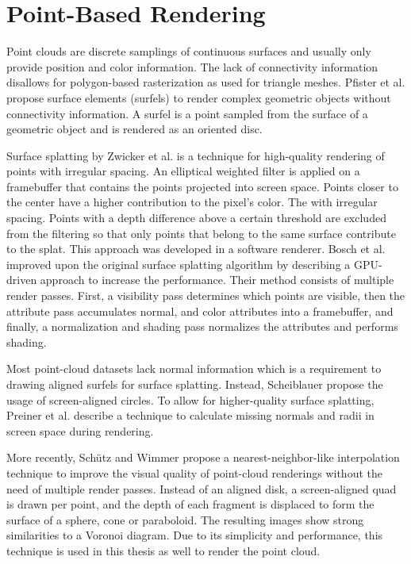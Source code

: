 \section{Point-Based Rendering}
\label{sec:related_work_point_rendering}
Point clouds are discrete samplings of continuous surfaces and usually only provide position and color information. The lack of connectivity information disallows for polygon-based rasterization as used for triangle meshes. Pfister et al. \cite{pfister2000surfels} propose surface elements (surfels) to render complex geometric objects without connectivity information. A surfel is a point sampled from the surface of a geometric object and is rendered as an oriented disc. 

\par

Surface splatting by Zwicker et al. \cite{zwicker2001surface} is a technique for high-quality rendering of points with irregular spacing. An elliptical weighted filter is applied on a framebuffer that contains the points projected into screen space. Points closer to the center have a higher contribution to the pixel's color. The with irregular spacing. Points with a depth difference above a certain threshold are excluded from the filtering so that only points that belong to the same surface contribute to the splat.  This approach was developed in a software renderer. Bosch et al. \cite{botsch2005high} improved upon the original surface splatting algorithm by describing a GPU-driven approach to increase the performance. Their method consists of multiple render passes. First, a visibility pass determines which points are visible, then the attribute pass accumulates normal, and color attributes into a framebuffer, and finally, a normalization and shading pass normalizes the attributes and performs shading. 

\par

Most point-cloud datasets lack normal information which is a requirement to drawing aligned surfels for surface splatting. Instead, Scheiblauer \cite{scheiblauer2011consolidated} propose the usage of screen-aligned circles. To allow for higher-quality surface splatting, Preiner et al. \cite{preiner2012auto} describe a technique to calculate missing normals and radii in screen space during rendering. 

\par

More recently, Schütz and Wimmer \cite{schutz2015high} propose a nearest-neighbor-like interpolation technique to improve the visual quality of point-cloud renderings without the need of multiple render passes. Instead of an aligned disk, a screen-aligned quad is drawn per point, and the depth of each fragment is displaced to form the surface of a sphere, cone or paraboloid. The resulting images show strong similarities to a Voronoi diagram. Due to its simplicity and performance, this technique is used in this thesis as well to render the point cloud. 
